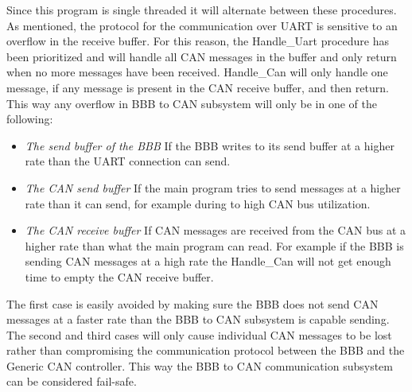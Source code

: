 Since this program is single threaded it will alternate between these procedures. \newline 
As mentioned, the protocol for the communication over UART is sensitive to an overflow in the receive buffer. For this reason, the Handle\_Uart procedure has been prioritized and will handle all CAN messages in the buffer and only return when no more messages have been received. Handle\_Can will only handle one message, if any message is present in the CAN receive buffer, and then return. \newline
This way any overflow in BBB to CAN subsystem will only be in one of the following:

\begin{itemize}
   \item { \em The send buffer of the BBB} \newline
   If the BBB writes to its send buffer at a higher rate than the UART connection can send.
   \item { \em The CAN send buffer} \newline
   If the main program tries to send messages at a higher rate than it can send, for example during to high CAN bus utilization.
   \item { \em The CAN receive buffer} \newline
   If CAN messages are received from the CAN bus at a higher rate than what the main program can read. For example if the BBB is sending CAN messages at a high rate the Handle\_Can will not get enough time to empty the CAN receive buffer.
\end{itemize}

The first case is easily avoided by making sure the BBB does not send CAN messages at a faster rate than the BBB to CAN subsystem is capable sending. The second and third cases will only cause individual CAN messages to be lost rather than compromising the communication protocol between the BBB and the Generic CAN controller. \newline
This way the BBB to CAN communication subsystem can be considered fail-safe.